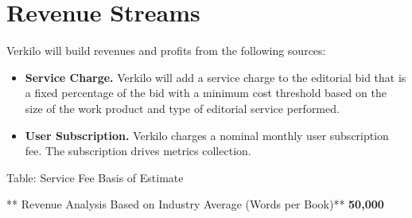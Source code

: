 \documentclass[10pt,openany]{book}
\begin{document}
\hypertarget{revenue-streams-1}{%
\section{Revenue Streams}\label{revenue-streams-1}}

Verkilo will build revenues and profits from the following sources:

\begin{itemize}
\item
  \textbf{Service Charge.} Verkilo will add a service charge to the
  editorial bid that is a fixed percentage of the bid with a minimum
  cost threshold based on the size of the work product and type of
  editorial service performed.
\item
  \textbf{User Subscription.} Verkilo charges a nominal monthly user
  subscription fee. The subscription drives metrics collection.
\end{itemize}

Table: Service Fee Basis of Estimate

** Revenue Analysis Based on Industry Average (Words per Book)**
\textbf{50,000}
\end{document}
